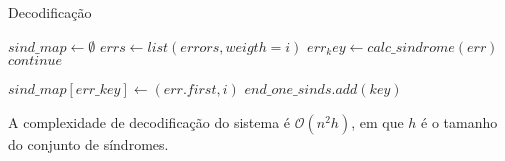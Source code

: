 \begin{algorithm}
	\caption{Decodificação}\label{alg:update_sindromes}
	\begin{algorithmic}[Message]
		\State $sind\_map \gets \emptyset$
			\State $errs \gets list(errors, weigth=i)$
				\State $err_key \gets calc\_sindrome(err)$
					\State $continue$
				\EndIf
				
				\State $sind\_map[err\_key] \gets (err.first, i)$
				\EndIf
			\EndFor
		\EndFor
				\State $end\_one\_sinds.add(key)$
			\EndIf
		\EndFor
		\EndProcedure
	\end{algorithmic}
\end{algorithm}

A complexidade de decodificação do sistema é  $\mathcal{O}(n^2h)$, em que $h$ é o tamanho do conjunto de síndromes.